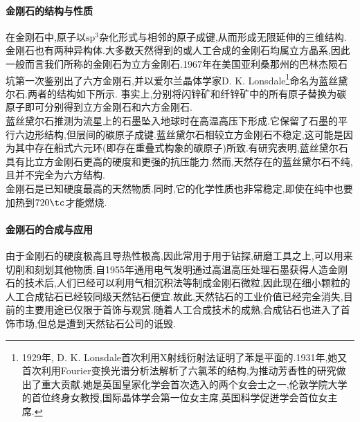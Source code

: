 \documentclass{ctexart}
\begin{document}
\paragraph{金刚石的结构与性质}
在金刚石中,原子以$\text{sp}^3$杂化形式与相邻的原子成键,从而形成无限延伸的三维结构.金刚石也有两种异构体.大多数天然得到的或人工合成的金刚石均属立方晶系,因此一般而言我们所称的金刚石为立方金刚石.1967年在美国亚利桑那州的巴林杰陨石坑第一次鉴别出了六方金刚石,并以爱尔兰晶体学家D. K. Lonsdale\footnote{1929年, D. K. Lonsdale首次利用X射线衍射法证明了苯是平面的.1931年,她又首次利用Fourier变换光谱分析法解析了六氯苯的结构,为推动芳香性的研究做出了重大贡献.她是英国皇家化学会首次选入的两个女会士之一,伦敦学院大学的首位终身女教授,国际晶体学会第一位女主席,英国科学促迸学会首位女主席.}命名为蓝丝黛尔石.两者的结构如下所示.
事实上,分别将闪锌矿和纤锌矿中的所有原子替换为碳原子即可分别得到立方金刚石和六方金刚石.\\
\indent 蓝丝黛尔石推测为流星上的石墨坠入地球时在高温高压下形成.它保留了石墨的平行六边形结构,但层间的碳原子成键.蓝丝黛尔石相较立方金刚石不稳定,这可能是因为其中存在船式六元环(即存在重叠式构象的碳原子)所致.有研究表明,蓝丝黛尔石具有比立方金刚石更高的硬度和更强的抗压能力.然而,天然存在的蓝丝黛尔石不纯,且并不完全为六方结构.\\
\indent 金刚石是已知硬度最高的天然物质.同时,它的化学性质也非常稳定,即使在纯中也要加热到$720\tc$才能燃烧.
\paragraph{金刚石的合成与应用}
由于金刚石的硬度极高且导热性极高,因此常用于用于钻探,研磨工具之上,可以用来切削和刻划其他物质.自1955年通用电气发明通过高温高压处理石墨获得人造金刚石的技术后,人们已经可以利用气相沉积法等制成金刚石微粒,因此现在细小颗粒的人工合成钻石已经较同级天然钻石便宜.故此,天然钻石的工业价值已经完全消失,目前的主要用途已仅限于首饰与观赏.随着人工合成技术的成熟,合成钻石也进入了首饰市场,但总是遭到天然钻石公司的诋毁.
\end{document}
